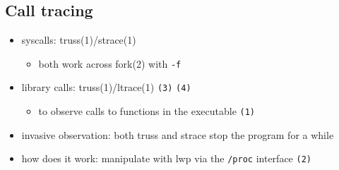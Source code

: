 \subsection{Call tracing}

\begin{itemize}
  \item syscalls: truss(1)/strace(1)
  \begin{itemize}
    \item both work across fork(2) with \texttt{-f}
  \end{itemize}
  \item library calls: truss(1)/ltrace(1) \texttt{(3)} \texttt{(4)}
    \begin{itemize}
    \item to observe calls to functions in the executable \texttt{(1)}
    \end{itemize}
  \item invasive observation: both truss and strace stop the program for a while
  \item how does it work: manipulate with lwp via the \texttt{/proc}
     interface \texttt{(2)}
\end{itemize}


